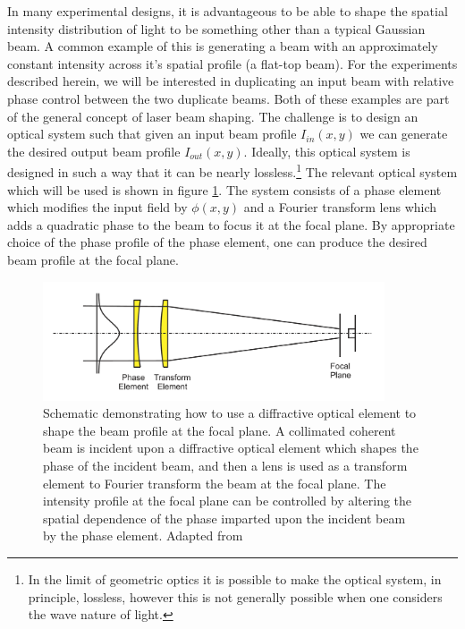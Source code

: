 In many experimental designs, it is advantageous to be able to shape the spatial intensity distribution of light to be something other than a typical Gaussian beam.  A common example of this is generating a beam with an approximately constant intensity across it's spatial profile (a flat-top beam).  For the experiments described herein, we will be interested in duplicating an input beam with relative phase control between the two duplicate beams.  Both of these examples are part of the general concept of laser beam shaping.  The challenge is to design an optical system such that given an input beam profile $I_{in}(x,y)$ we can generate the desired output beam profile $I_{out}(x,y)$. Ideally, this optical system is designed in such a way that it can be nearly lossless.\footnote{In the limit of geometric optics it is possible to make the optical system, in principle, lossless, however this is not generally possible when one considers the wave nature of light.}  The relevant optical system which will be used is shown in figure \ref{fig:beam_shaping_scheme}.  The system consists of a phase element which modifies the input field by $\phi(x,y)$ and a Fourier transform lens which adds a quadratic phase to the beam to focus it at the focal plane.  By appropriate choice of the phase profile of the phase element, one can produce the desired beam profile at the focal plane.


\begin{figure}
	\centering
	\includegraphics[width=0.9\textwidth]{figures/Two_source/romero_beam_shaping_schematic.png}
	\caption{Schematic demonstrating how to use a diffractive optical element to shape the beam profile at the focal plane. A collimated coherent beam is incident upon a diffractive optical element which shapes the phase of the incident beam, and then a lens is used as a transform element to Fourier transform the beam at the focal plane.  The intensity profile at the focal plane can be controlled by altering the spatial dependence of the phase imparted upon the incident beam by the phase element. Adapted from \cite{romeroMathematicalAspectsLaser2010}}
	\label{fig:beam_shaping_scheme}
\end{figure}



